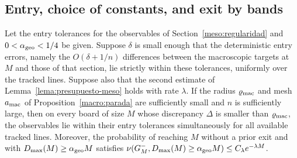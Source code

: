 \subsection{Entry, choice of constants, and exit by bands}\label{meso:constantes}
\begin{lema}\label{meso:entrada}
Let the entry tolerances for the observables of Section~\ref{meso:regularidad} and
$0<\alpha_{\rm geo}<1/4$ be given. Suppose $\delta$ is small enough that the deterministic entry errors,
namely the $O(\delta+1/n)$ differences between the macroscopic targets at $M$ and those of that section,
lie strictly within these tolerances, uniformly over the tracked lines. Suppose also that the second
estimate of Lemma~\ref{lema:presupuesto-meso} holds with rate $\lambda$. If the radius $\varrho_{\rm mac}$
and mesh $a_{\rm mac}$ of Proposition~\ref{macro:parada} are sufficiently small and $n$ is sufficiently
large, then on every board of size $M$ whose discrepancy $\Delta$ is smaller than $\varrho_{\rm mac}$, the
observables lie within their entry tolerances simultaneously for all available tracked lines. Moreover,
the probability of reaching $M$ without a prior exit and with $D_{\max}(M)\ge\alpha_{\rm geo} M$ satisfies
$\nu(G_M^-,D_{\max}(M)\ge\alpha_{\rm geo} M)\le C_\lambda e^{-\lambda M}$.
\end{lema}

